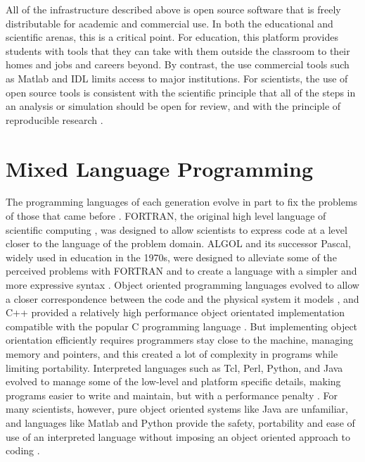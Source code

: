All of the infrastructure described above is open source software
that is freely distributable for academic and commercial use. In both
the educational and scientific arenas, this is a critical point. For
education, this platform provides students with tools that they can
take with them outside the classroom to their homes and jobs and careers
beyond. By contrast, the use commercial tools such as Matlab and IDL
limits access to major institutions. For scientists, the use of open
source tools is consistent with the scientific principle that all
of the steps in an analysis or simulation should be open for review,
and with the principle of reproducible research \cite{BuckheitDonoho1995}.


\section{Mixed Language Programming}

The programming languages of each generation evolve in part to fix
the problems of those that came before \cite{BerginEtal1996}. \textsc{FORTRAN},
the original high level language of scientific computing \cite{Rosen1967},
was designed to allow scientists to express code at a level closer
to the language of the problem domain. \textsc{ALGOL} and its successor
Pascal, widely used in education in the 1970s, were designed to alleviate
some of the perceived problems with \textsc{FORTRAN} and to create
a language with a simpler and more expressive syntax \cite{Backus1963,Naur1963}.
Object oriented programming languages evolved to allow a closer correspondence
between the code and the physical system it models \cite{GoldbergRobson1989},
and C++ provided a relatively high performance object orientated implementation
compatible with the popular C programming language \cite{Stroustrup1994,Stroustrup2000}.
But implementing object orientation efficiently requires programmers
stay close to the machine, managing memory and pointers, and this
created a lot of complexity in programs while limiting portability.
Interpreted languages such as Tcl, Perl, Python, and Java evolved
to manage some of the low-level and platform specific details, making
programs easier to write and maintain, but with a performance penalty
\cite{Ousterhout1998,ArnoldEtal2005}. For many scientists, however,
pure object oriented systems like Java are unfamiliar, and languages
like Matlab and Python provide the safety, portability and ease of
use of an interpreted language without imposing an object oriented
approach to coding \cite{VanRossumDrake2003,HanselmanLittlefield2004}.

